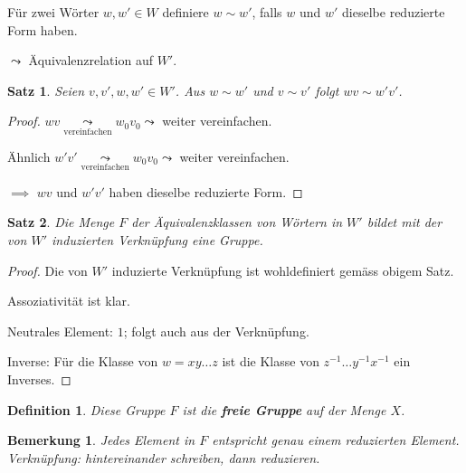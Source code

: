 \documentclass{article}
\theoremstyle{plain}
\newtheorem{definition}{Definition}
\newtheorem{theorem}{Satz}
\newtheorem{bemerkung}{Bemerkung}
\newcommand{\defn}[1]{\textbf{#1}}
\begin{document}
Für zwei Wörter $w,w'\in W$ definiere $w\sim w'$, falls $w$ und $w'$ dieselbe reduzierte Form haben.

$\leadsto$ Äquivalenzrelation auf $W'$.

\begin{theorem}
    Seien $v,v',w,w'\in W'$. Aus $w\sim w'$ und $v\sim v'$ folgt $wv\sim w'v'$.
\end{theorem}
\begin{proof}
    $wv\underset{\text{vereinfachen}}{\leadsto} w_0v_0\leadsto$ weiter vereinfachen.

    Ähnlich $w'v'\underset{\text{vereinfachen}}{\leadsto} w_0v_0 \leadsto$ weiter vereinfachen. 
    
    $\implies$ $wv$ und $w'v'$ haben dieselbe reduzierte Form.
\end{proof}

\begin{theorem}
    Die Menge $F$ der Äquivalenzklassen von Wörtern in $W'$ bildet  mit der von $W'$ induzierten Verknüpfung eine Gruppe.
\end{theorem}
\begin{proof}
    Die von $W'$ induzierte Verknüpfung ist wohldefiniert gemäss obigem Satz.
    
    Assoziativität ist klar.
    
    Neutrales Element: $1$; folgt auch aus der Verknüpfung.

    Inverse: Für die Klasse von $w=xy\ldots z$ ist die Klasse von $z^{-1}\ldots y^{-1}x^{-1}$ ein Inverses.
\end{proof}
\begin{definition}
    Diese Gruppe $F$ ist die \defn{freie Gruppe} auf der Menge $X$.
\end{definition}

\begin{bemerkung}
    Jedes Element in $F$ entspricht genau einem reduzierten Element.
    Verknüpfung: hintereinander schreiben, dann reduzieren.
\end{bemerkung}
\end{document}
